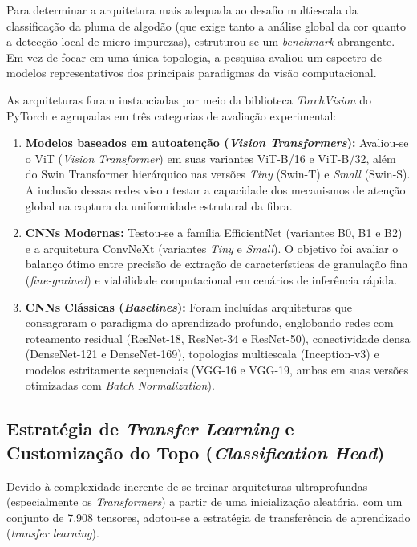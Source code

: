 
Para determinar a arquitetura mais adequada ao desafio multiescala da classificação da pluma de algodão (que exige tanto a análise global da cor quanto a detecção local de micro-impurezas), estruturou-se um \textit{benchmark} abrangente. Em vez de focar em uma única topologia, a pesquisa avaliou um espectro de modelos representativos dos principais paradigmas da visão computacional.

As arquiteturas foram instanciadas por meio da biblioteca \textit{TorchVision} do PyTorch \cite{paszke2017automatic} e agrupadas em três categorias de avaliação experimental:

\begin{enumerate}
    \item \textbf{Modelos baseados em autoatenção (\textit{Vision Transformers}):} Avaliou-se o ViT (\textit{Vision Transformer}) em suas variantes ViT-B/16 e ViT-B/32, além do Swin Transformer hierárquico nas versões \textit{Tiny} (Swin-T) e \textit{Small} (Swin-S). A inclusão dessas redes visou testar a capacidade dos mecanismos de atenção global na captura da uniformidade estrutural da fibra.
    
    \item \textbf{CNNs Modernas:} Testou-se a família EfficientNet (variantes B0, B1 e B2) e a arquitetura ConvNeXt (variantes \textit{Tiny} e \textit{Small}). O objetivo foi avaliar o balanço ótimo entre precisão de extração de características de granulação fina (\textit{fine-grained}) e viabilidade computacional em cenários de inferência rápida.
    
    \item \textbf{CNNs Clássicas (\textit{Baselines}):} Foram incluídas arquiteturas que consagraram o paradigma do aprendizado profundo, englobando redes com roteamento residual (ResNet-18, ResNet-34 e ResNet-50), conectividade densa (DenseNet-121 e DenseNet-169), topologias multiescala (Inception-v3) e modelos estritamente sequenciais (VGG-16 e VGG-19, ambas em suas versões otimizadas com \textit{Batch Normalization}).
\end{enumerate}

\subsection{Estratégia de \textit{Transfer Learning} e Customização do Topo (\textit{Classification Head})}

    Devido à complexidade inerente de se treinar arquiteturas ultraprofundas (especialmente os \textit{Transformers}) a partir de uma inicialização aleatória, com um conjunto de 7.908 tensores, adotou-se a estratégia de transferência de aprendizado (\textit{transfer learning}). 
    
